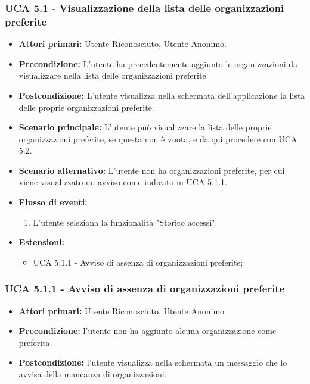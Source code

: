 \subsubsection{UCA 5.1 - Visualizzazione della lista delle organizzazioni preferite}
\begin{itemize}
    \item \textbf{Attori primari:} Utente Riconosciuto, Utente Anonimo.
    \item \textbf{Precondizione:} L’utente ha precedentemente aggiunto le organizzazioni da visualizzare nella lista delle organizzazioni preferite.
    \item \textbf{Postcondizione:} L’utente visualizza nella schermata dell’applicazione la lista delle proprie organizzazioni preferite. 
    \item \textbf{Scenario principale:} L'utente può visualizzare la lista delle proprie organizzazioni preferite, se questa non è vuota, e da qui procedere con UCA 5.2.
    \item \textbf{Scenario alternativo:} L'utente non ha organizzazioni preferite, per cui viene visualizzato un avviso come indicato in UCA 5.1.1.
    \item \textbf{Flusso di eventi:}
    \begin{enumerate}
        \item L'utente seleziona la funzionalità "Storico accessi".
    \end{enumerate}
    \item \textbf{Estensioni:}
    \begin{itemize}
        \item UCA 5.1.1 - Avviso di assenza di organizzazioni preferite;
    \end{itemize}
\end{itemize}

\subsubsection{UCA 5.1.1 - Avviso di assenza di organizzazioni preferite}
\begin{itemize}
    \item \textbf{Attori primari:} Utente Riconosciuto, Utente Anonimo
    \item \textbf{Precondizione:} l'utente non ha aggiunto alcuna organizzazione come preferita.
    \item \textbf{Postcondizione:} l'utente visualizza nella schermata un messaggio che lo avvisa della mancanza di organizzazioni.
\end{itemize}

